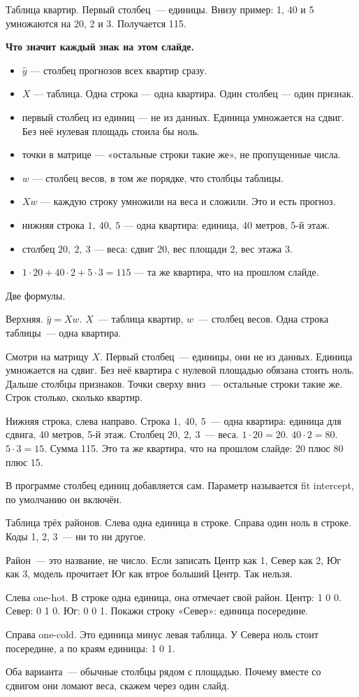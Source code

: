 \documentclass[11pt,a4paper]{article}
\newcommand{\slidehead}[2]{\par\vspace{4mm}{\color{navy}\large\bfseries Слайд #1. #2}\par\vspace{1mm}}
\newcommand{\screen}[1]{\par{\color{ink}\small #1\par}\vspace{1mm}}
\newcommand{\say}[1]{\begin{saybox}#1\end{saybox}}
\newenvironment{signs}{\begin{signbox}{\bfseries Что значит каждый знак на этом слайде.}\par\begin{itemize}[leftmargin=1.15em,itemsep=2pt,topsep=3pt,parsep=0pt]}{\end{itemize}\end{signbox}}
\begin{document}
\slidehead{8}{Матрица}
\screen{Таблица квартир. Первый столбец~--- единицы. Внизу пример: 1, 40 и 5 умножаются на 20, 2 и 3. Получается 115.}
\begin{signs}
\item \(\hat y\) — столбец прогнозов всех квартир сразу.
\item \(X\) — таблица. Одна строка — одна квартира. Один столбец — один признак.
\item первый столбец из единиц — не из данных. Единица умножается на сдвиг. Без неё нулевая площадь стоила бы ноль.
\item точки в матрице — «остальные строки такие же», не пропущенные числа.
\item \(w\) — столбец весов, в том же порядке, что столбцы таблицы.
\item \(Xw\) — каждую строку умножили на веса и сложили. Это и есть прогноз.
\item нижняя строка \(1,\ 40,\ 5\) — одна квартира: единица, 40 метров, 5-й этаж.
\item столбец \(20,\ 2,\ 3\) — веса: сдвиг 20, вес площади 2, вес этажа 3.
\item \(1\cdot 20+40\cdot 2+5\cdot 3=115\) — та же квартира, что на прошлом слайде.
\end{signs}
\say{Две формулы.

Верхняя. \(\hat y=Xw\). \(X\)~--- таблица квартир, \(w\)~--- столбец весов. Одна строка таблицы~--- одна квартира.

Смотри на матрицу \(X\). Первый столбец~--- единицы, они не из данных. Единица умножается на сдвиг. Без неё квартира с нулевой площадью обязана стоить ноль. Дальше столбцы признаков. Точки сверху вниз~--- остальные строки такие же. Строк столько, сколько квартир.

Нижняя строка, слева направо. Строка \(1,\ 40,\ 5\)~--- одна квартира: единица для сдвига, 40 метров, 5-й этаж. Столбец \(20,\ 2,\ 3\)~--- веса. \(1\cdot 20=20\). \(40\cdot 2=80\). \(5\cdot 3=15\). Сумма 115. Это та же квартира, что на прошлом слайде: 20 плюс 80 плюс 15.

В программе столбец единиц добавляется сам. Параметр называется fit intercept, по умолчанию он включён.}

\slidehead{9}{One-hot и one-cold}
\screen{Таблица трёх районов. Слева одна единица в строке. Справа один ноль в строке. Коды 1, 2, 3~--- ни то ни другое.}
\say{Район~--- это название, не число. Если записать Центр как 1, Север как 2, Юг как 3, модель прочитает Юг как втрое больший Центр. Так нельзя.

Слева one-hot. В строке одна единица, она отмечает свой район. Центр: 1 0 0. Север: 0 1 0. Юг: 0 0 1. Покажи строку «Север»: единица посередине.

Справа one-cold. Это единица минус левая таблица. У Севера ноль стоит посередине, а по краям единицы: 1 0 1.

Оба варианта~--- обычные столбцы рядом с площадью. Почему вместе со сдвигом они ломают веса, скажем через один слайд.}
\end{document}

